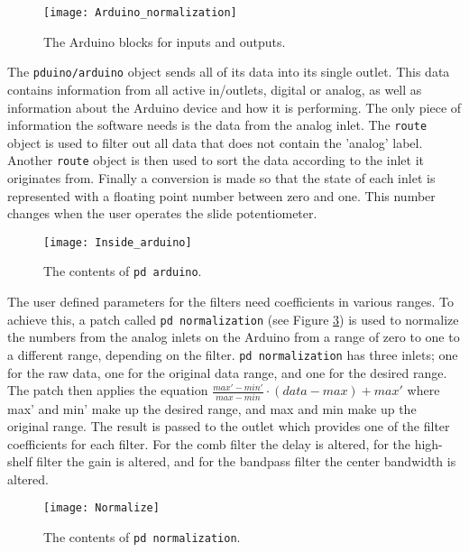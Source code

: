 \begin{figure}
\centering
\texttt{[image: Arduino\_normalization]}
\caption{The Arduino blocks for inputs and outputs.}
\label{Fig:Arudino_normalization}
\end{figure}

The \texttt{pduino/arduino} object sends all of its data into its single outlet. This data contains information from all active in/outlets, digital or analog, as well as information about the Arduino device and how it is performing. The only piece of information the software needs is the data from the analog inlet. The \texttt{route} object is used to filter out all data that does not contain the 'analog' label. Another \texttt{route} object is then used to sort the data according to the inlet it originates from. Finally a conversion is made so that the state of each inlet is represented with a floating point number between zero and one. This number changes when the user operates the slide potentiometer.


\begin{figure}
\centering
\texttt{[image: Inside\_arduino]}
\caption{The contents of \texttt{pd arduino}.}
\label{Fig:Inside_arduino}
\end{figure}

The user defined parameters for the filters need coefficients in various ranges. To achieve this, a patch called \texttt{pd normalization} (see Figure \ref{Fig:Normalize}) is used to normalize the numbers from the analog inlets on the Arduino from a range of zero to one to a different range, depending on the filter. \texttt{pd normalization} has three inlets; one for the raw data, one for the original data range, and one for the desired range. The patch then applies the equation $\frac{max'-min'}{max-min}\cdot (data-max)+max'$ where max' and min' make up the desired range, and max and min make up the original range. The result is passed to the outlet which provides one of the filter coefficients for each filter. For the comb filter the delay is altered, for the high-shelf filter the gain is altered, and for the bandpass filter the center bandwidth is altered.

\begin{figure}
\centering
\texttt{[image: Normalize]}
\caption{The contents of \texttt{pd normalization}.}
\label{Fig:Normalize}
\end{figure}